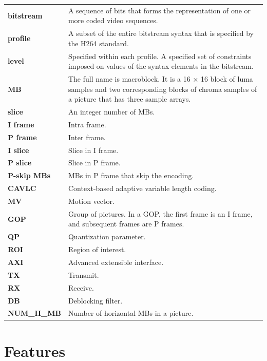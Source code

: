 \documentclass[main\_\_EN.tex]{subfiles}
\begin{document}
\begin{longtable}[c]{ R{4cm} p{12cm} }
\textbf{bitstream} & A sequence of bits that forms the representation of one or more coded video sequences. \\
\textbf{profile} & A subset of the entire bitstream syntax that is specified by the H264 standard. \\
\textbf{level} & Specified within each profile. A specified set of constraints imposed on values of the syntax elements in the bitstream. \\
\textbf{MB} & The full name is macroblock. It is a 16 × 16 block of luma samples and two corresponding blocks of chroma samples of a picture that has three sample arrays. \\
\textbf{slice} & An integer number of MBs. \\
\textbf{I frame} & Intra frame. \\
\textbf{P frame} & Inter frame. \\
\textbf{I slice} & Slice in I frame. \\
\textbf{P slice} & Slice in P frame. \\
\textbf{P-skip MBs} & MBs in P frame that skip the encoding. \\
\textbf{CAVLC} & Context-based adaptive variable length coding. \\
\textbf{MV} & Motion vector. \\
\textbf{GOP} & Group of pictures. In a GOP, the first frame is an I frame, and subsequent frames are P frames. \\
\textbf{QP} & Quantization parameter. \\
\textbf{ROI} & Region of interest. \\
\textbf{AXI} & Advanced extensible interface. \\
\textbf{TX} & Transmit. \\
\textbf{RX} & Receive. \\
\textbf{DB} & Deblocking filter.\\
\textbf{NUM\_H\_MB} &  Number of horizontal MBs in a picture.\\
\end{longtable}


\section{Features}
\label{sec:h264enc-features}
\end{document}
